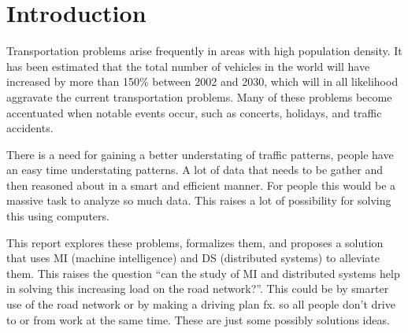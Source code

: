 \chapter*{Introduction}\label{chap:introduction}

Transportation problems arise frequently in areas with high population density. It has been estimated that the total number of vehicles in the world will have increased by more than 150\% between 2002 and 2030\cite{dargay2007vehicle}, which will in all likelihood aggravate the current transportation problems. Many of these problems become accentuated when notable events occur, such as concerts, holidays, and traffic accidents.

There is a need for gaining a better understating of traffic patterns, people have an easy time understating patterns. A lot of data that needs to be gather and then reasoned about in a smart and efficient manner. For people this would be a massive task to analyze so much data. This raises a lot of possibility for solving this using computers.

This report explores these problems, formalizes them, and proposes a solution that uses MI (machine intelligence) and DS (distributed systems) to alleviate them. This raises the question ``can the study of MI and distributed systems help in solving this increasing load on the road network?''. This could be by smarter use of the road network or by making a driving plan fx. so all people don't drive to or from work at the same time. These are just some possibly solutions ideas.




